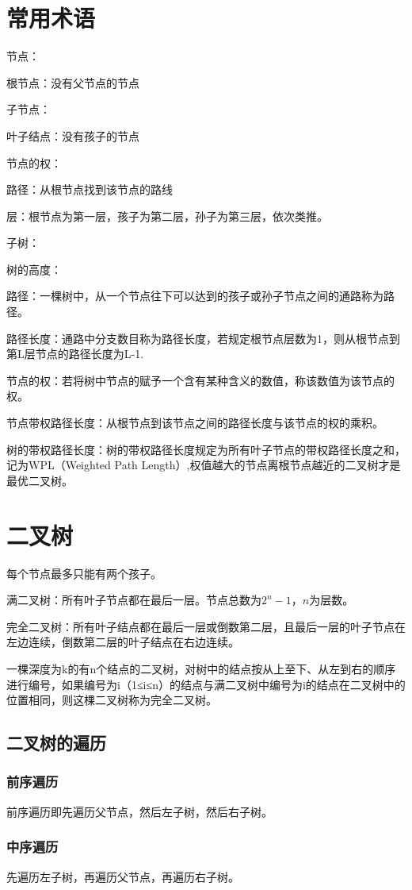 \documentclass[a4paper]{report}
\begin{document}
\section{常用术语}
节点：

根节点：没有父节点的节点

子节点：

叶子结点：没有孩子的节点

节点的权：

路径：从根节点找到该节点的路线

层：根节点为第一层，孩子为第二层，孙子为第三层，依次类推。

子树：

树的高度：

路径：一棵树中，从一个节点往下可以达到的孩子或孙子节点之间的通路称为路径。

路径长度：通路中分支数目称为路径长度，若规定根节点层数为1，则从根节点到第L层节点的路径长度为L-1.

节点的权：若将树中节点的赋予一个含有某种含义的数值，称该数值为该节点的权。

节点带权路径长度：从根节点到该节点之间的路径长度与该节点的权的乘积。

树的带权路径长度：树的带权路径长度规定为所有叶子节点的带权路径长度之和，记为WPL（Weighted Path Length）,权值越大的节点离根节点越近的二叉树才是最优二叉树。
\section{二叉树}
每个节点最多只能有两个孩子。

满二叉树：所有叶子节点都在最后一层。节点总数为$2^n - 1$，$n$为层数。

完全二叉树：所有叶子结点都在最后一层或倒数第二层，且最后一层的叶子节点在左边连续，倒数第二层的叶子结点在右边连续。

一棵深度为k的有n个结点的二叉树，对树中的结点按从上至下、从左到右的顺序进行编号，如果编号为i（1≤i≤n）的结点与满二叉树中编号为i的结点在二叉树中的位置相同，则这棵二叉树称为完全二叉树。
\subsection{二叉树的遍历}
\subsubsection{前序遍历}
前序遍历即先遍历父节点，然后左子树，然后右子树。

\subsubsection{中序遍历}
先遍历左子树，再遍历父节点，再遍历右子树。
\end{document}
